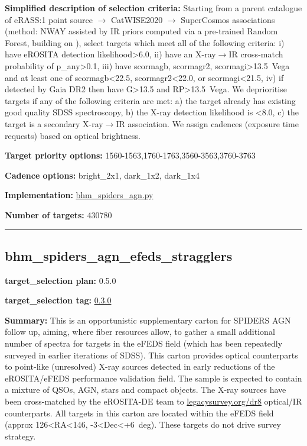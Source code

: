 \noindent\textbf{Simplified description of selection criteria:} Starting from a
parent catalogue of eRASS:1 point source $\rightarrow$ CatWISE2020 $\rightarrow$ SuperCosmos
associations (method: NWAY assisted by IR priors computed via a
pre-trained Random Forest, building on
\citealt{Salvato2022}), select targets which meet all of the following criteria:
i) have eROSITA detection likelihood\textgreater{}6.0, ii) have an
X-ray$\rightarrow$IR cross-match probability of p\_any\textgreater{}0.1, iii) have
scormagb, scormagr2, scormagi\textgreater{}13.5~Vega and at least one of
scormagb\textless{}22.5, scormagr2\textless{}22.0, or
scormagi\textless{}21.5, iv) if detected by Gaia DR2 then have
G\textgreater{}13.5 and RP\textgreater{}13.5~Vega. We deprioritise
targets if any of the following criteria are met: a) the target already
has existing good quality SDSS spectroscopy, b) the X-ray detection
likelihood is \textless{}8.0, c) the target is a secondary X-ray$\rightarrow$IR
association. We assign cadences (exposure time requests) based on
optical brightness.


\noindent\textbf{Target priority options:}
1560-1563,1760-1763,3560-3563,3760-3763

\noindent\textbf{Cadence options:} bright\_2x1, dark\_1x2, dark\_1x4

\noindent\textbf{Implementation:}
\href{https://github.com/sdss/target_selection/blob/0.3.0/python/target_selection/cartons/bhm_spiders_agn.py}{bhm\_spiders\_agn.py}

\noindent\textbf{Number of targets:} 430780

\begin{center}\rule{0.5\linewidth}{0.5pt}\end{center}

\hypertarget{bhm_spiders_agn_efeds_stragglers_plan0.5.0}{%
\subsection{bhm\_spiders\_agn\_efeds\_stragglers}\label{bhm_spiders_agn_efeds_stragglers_plan0.5.0}}

\noindent\textbf{target\_selection plan:} 0.5.0

\noindent\textbf{target\_selection tag:}
\href{https://github.com/sdss/target_selection/tree/0.3.0/}{0.3.0}

\noindent\textbf{Summary:} This is an opportunistic supplementary carton for
SPIDERS AGN follow up, aiming, where fiber resources allow, to gather a
small additional number of spectra for targets in the eFEDS field (which
has been repeatedly surveyed in earlier iterations of SDSS). This carton
provides optical counterparts to point-like (unresolved) X-ray sources
detected in early reductions of the eROSITA/eFEDS performance validation
field. The sample is expected to contain a mixture of QSOs, AGN, stars
and compact objects. The X-ray sources have been cross-matched by the
eROSITA-DE team to
\href{https://www.legacysurvey.org/dr8/}{legacysurvey.org/dr8}
optical/IR counterparts. All targets in this carton are located within
the eFEDS field (approx 126\textless{}RA\textless{}146,
-3\textless{}Dec\textless{}+6~deg). These targets do not drive survey
strategy.

